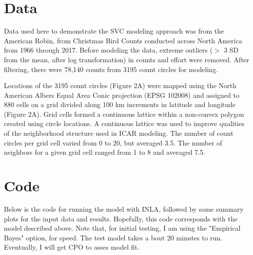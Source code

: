 \documentclass[]{article}
\begin{document}
\section{Data}
Data used here to demonstrate the SVC modeling approach was from the American Robin, from Christmas Bird Counts conducted across North America from 1966 through 2017. Before modeling the data, extreme outliers ($>$ 3 SD from the mean, after log transformation) in counts and effort were removed. After filtering, there were 78,140 counts from 3195 count circles for modeling.

Locations of the 3195 count circles (Figure 2A) were mapped using the North American Albers Equal Area Conic projection (EPSG 102008) and assigned to 880 cells on a grid divided along 100 km increments in latitude and longitude (Figure 2A). Grid cells formed a continuous lattice within a non-convex polygon created using circle locations. A continuous lattice was used to improve qualities of the neighborhood structure used in ICAR modeling. The number of count circles per grid cell varied from 0 to 20, but averaged 3.5. The number of neighbors for a given grid cell ranged from 1 to 8 and averaged 7.5.



\section{Code}
Below is the code for running the model with INLA, followed by some summary plots for the input data and results. Hopefully, this code corresponds with the model described above. Note that, for initial testing, I am using the "Empirical Bayes" option, for speed. The test model takes a bout 20 minutes to run. Eventually, I will get CPO to asses model fit. 
\end{document}
